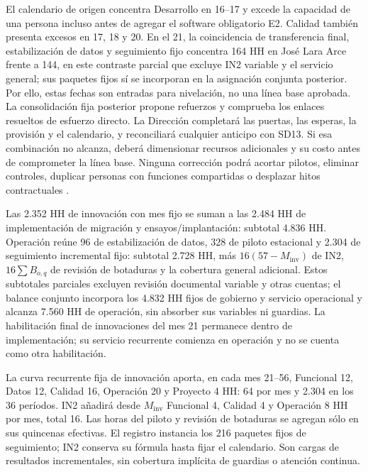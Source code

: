 


El calendario de origen concentra Desarrollo en 16--17 y excede la capacidad de una persona incluso antes de agregar el software obligatorio E2. Calidad también presenta excesos en 17, 18 y 20. En el 21, la coincidencia de transferencia final, estabilización de datos y seguimiento fijo concentra 164 HH en José Lara Arce frente a 144, en este contraste parcial que excluye IN2 variable y el servicio general; sus paquetes fijos sí se incorporan en la asignación conjunta posterior. Por ello, estas fechas son entradas para nivelación, no una línea base aprobada. La consolidación fija posterior propone refuerzos y comprueba los enlaces resueltos de esfuerzo directo. La Dirección completará las puertas, las esperas, la provisión y el calendario, y reconciliará cualquier anticipo con SD13. Si esa combinación no alcanza, deberá dimensionar recursos adicionales y su costo antes de comprometer la línea base. Ninguna corrección podrá acortar pilotos, eliminar controles, duplicar personas con funciones compartidas o desplazar hitos contractuales \parencite[art.~17; Formulario~T-15; pp.~12--63]{bases-admin}.

Las 2.352 HH de innovación con mes fijo se suman a las 2.484 HH de implementación de migración y ensayos/implantación: subtotal 4.836 HH. Operación reúne 96 de estabilización de datos, 328 de piloto estacional y 2.304 de seguimiento incremental fijo: subtotal 2.728 HH, más $16(57-M_{\mathrm{inv}})$ de IN2, $16\sum B_{o,q}$ de revisión de botaduras y la cobertura general adicional. Estos subtotales parciales excluyen revisión documental variable y otras cuentas; el balance conjunto incorpora los 4.832 HH fijos de gobierno y servicio operacional y alcanza 7.560 HH de operación, sin absorber sus variables ni guardias. La habilitación final de innovaciones del mes 21 permanece dentro de implementación; su servicio recurrente comienza en operación y no se cuenta como otra habilitación.

La curva recurrente fija de innovación aporta, en cada mes 21--56, Funcional 12, Datos 12, Calidad 16, Operación 20 y Proyecto 4 HH: 64 por mes y 2.304 en los 36 períodos. IN2 añadirá desde $M_{\mathrm{inv}}$ Funcional 4, Calidad 4 y Operación 8 HH por mes, total 16. Las horas del piloto y revisión de botaduras se agregan sólo en sus quincenas efectivas. El registro  instancia los 216 paquetes fijos de seguimiento; IN2 conserva su fórmula hasta fijar el calendario. Son cargas de resultados incrementales, sin cobertura implícita de guardias o atención continua.
